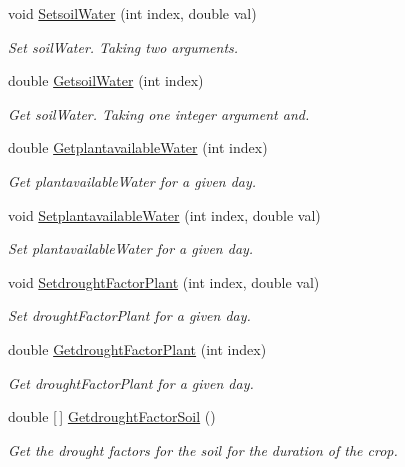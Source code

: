 \begin{DoxyCompactItemize}
\item 
void \mbox{\hyperlink{class_crop_class_a093789f200178b78f5d396b41ec63282}{Setsoil\+Water}} (int index, double val)
\begin{DoxyCompactList}\small\item\em Set soil\+Water. Taking two arguments. \end{DoxyCompactList}\item 
double \mbox{\hyperlink{class_crop_class_a33c608750cdab30a96f2ac722718f775}{Getsoil\+Water}} (int index)
\begin{DoxyCompactList}\small\item\em Get soil\+Water. Taking one integer argument and. \end{DoxyCompactList}\item 
double \mbox{\hyperlink{class_crop_class_a4c6eada04185e8600ba098d364aea67c}{Getplantavailable\+Water}} (int index)
\begin{DoxyCompactList}\small\item\em Get plantavailable\+Water for a given day. \end{DoxyCompactList}\item 
void \mbox{\hyperlink{class_crop_class_adceae8d43466fbdb1a1de452ad986e76}{Setplantavailable\+Water}} (int index, double val)
\begin{DoxyCompactList}\small\item\em Set plantavailable\+Water for a given day. \end{DoxyCompactList}\item 
void \mbox{\hyperlink{class_crop_class_aefba485b0eb0cd124efac1b597346d86}{Setdrought\+Factor\+Plant}} (int index, double val)
\begin{DoxyCompactList}\small\item\em Set drought\+Factor\+Plant for a given day. \end{DoxyCompactList}\item 
double \mbox{\hyperlink{class_crop_class_a71d200f742a1fc48262f0e6f81532fe6}{Getdrought\+Factor\+Plant}} (int index)
\begin{DoxyCompactList}\small\item\em Get drought\+Factor\+Plant for a given day. \end{DoxyCompactList}\item 
double \mbox{[}$\,$\mbox{]} \mbox{\hyperlink{class_crop_class_aedfde0a699a41708e663c9d2e6606106}{Getdrought\+Factor\+Soil}} ()
\begin{DoxyCompactList}\small\item\em Get the drought factors for the soil for the duration of the crop. \end{DoxyCompactList}\item 

\end{DoxyCompactItemize}
